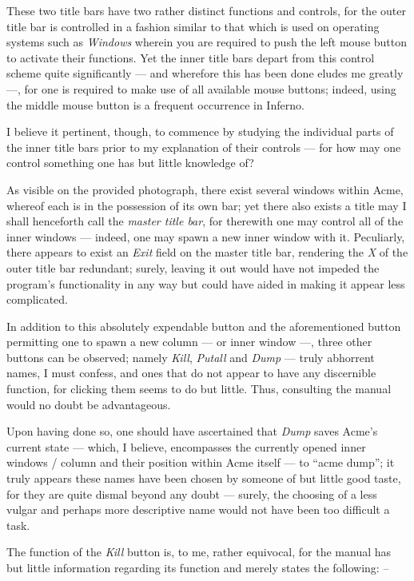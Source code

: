 \documentclass[a5paper,twoside,12pt]{report}
\begin{document}
   These two title bars have two rather distinct functions and controls, for the outer title bar is controlled in a fashion similar to that which is used on operating systems such as \textit{Windows} wherein you are required to push the left mouse button to activate their functions. Yet the inner title bars depart from this control scheme quite significantly — and wherefore this has been done eludes me greatly —, for one is required to make use of all available mouse buttons; indeed, using the middle mouse button is a frequent occurrence in Inferno.

   I believe it pertinent, though, to commence by studying the individual parts of the inner title bars prior to my explanation of their controls — for how may one control something one has but little knowledge of?

  As visible on the provided photograph, there exist several windows within Acme, whereof each is in the possession of its own bar; yet there also exists a title may I shall henceforth call the \textit{master title bar}, for therewith one may control all of the inner windows — indeed, one may spawn a new inner window with it. Peculiarly, there appears to exist an \textit {Exit} field on the master title bar, rendering the \textit{X} of the outer title bar redundant; surely, leaving it out would have not impeded the program's functionality in any way but could have aided in making it appear less complicated.

  In addition to this absolutely expendable button and the aforementioned button permitting one to spawn a new column — or inner window —, three other buttons can be observed; namely \textit{Kill}, \textit{Putall} and \textit{Dump} — truly abhorrent names, I must confess, and ones that do not appear to have any discernible function, for clicking them seems to do but little. Thus, consulting the manual would no doubt be advantageous. 

  Upon having done so, one should have ascertained that \textit{Dump} saves Acme's current state — which, I believe, encompasses the currently opened inner windows / column and their position within Acme itself — to ``acme dump''; it truly appears these names have been chosen by someone of but little good taste, for they are quite dismal beyond any doubt — surely, the choosing of a less vulgar and perhaps more descriptive name would not have been too difficult a task.

  The function of the \textit{Kill} button is, to me, rather equivocal, for the manual has but little information regarding its function and merely states the following: –
\end{document}
